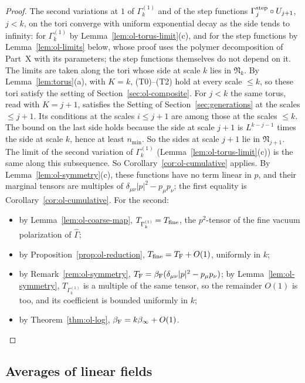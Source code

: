 \begin{proof}
The second variations at $1$ of $\Gamma^{(1)}_k$ and of the step functions $\Gamma^{\rm step}_j\circ U_{j+1}$, $j<k$, on the tori converge with uniform exponential decay as the side tends to infinity: for $\Gamma^{(1)}_k$ by Lemma~\ref{lem:ol-torus-limit}(c), and for the step functions by Lemma~\ref{lem:ol-limits} below, whose proof uses the polymer decomposition of Part~X with its parameters; the step functions themselves do not depend on it. The limits are taken along the tori whose side at scale $k$ lies in $\mathfrak N_k$. By Lemma~\ref{lem:torus}(a), with $K=k$, (T0)--(T2) hold at every scale $\le k$, so these tori satisfy the setting of Section~\ref{sec:ol-composite}. For $j<k$ the same torus, read with $K=j+1$, satisfies the Setting of Section~\ref{sec:generations} at the scales $\le j+1$. Its conditions at the scales $i\le j+1$ are among those at the scales $\le k$. The bound on the last side holds because the side at scale $j+1$ is $L^{k-j-1}$ times the side at scale $k$, hence at least $n_{\min}$. So the sides at scale $j+1$ lie in $\mathfrak N_{j+1}$. The limit of the second variation of $\Gamma^{(1)}_k$ (Lemma~\ref{lem:ol-torus-limit}(c)) is the same along this subsequence. So Corollary~\ref{cor:ol-cumulative} applies. By Lemma~\ref{lem:ol-symmetry}(c), these functions have no term linear in $p$, and their marginal tensors are multiples of $\delta_{\mu\nu}|p|^2-p_\mu p_\nu$; the first equality is Corollary~\ref{cor:ol-cumulative}. For the second:
\begin{itemize}
\item by Lemma~\ref{lem:ol-coarse-map}, $T_{\Gamma^{(1)}_k}=T_{\rm fine}$, the $p^2$-tensor of the fine vacuum polarization of $\widehat\Gamma$;
\item by Proposition~\ref{prop:ol-reduction}, $T_{\rm fine}=T_{\rm F}+O(1)$, uniformly in $k$;
\item by Remark~\ref{rem:ol-symmetry}, $T_{\rm F}=\beta_{\rm F}(\delta_{\mu\nu}|p|^2-p_\mu p_\nu)$; by Lemma~\ref{lem:ol-symmetry}, $T_{\Gamma^{(1)}_k}$ is a multiple of the same tensor, so the remainder $O(1)$ is too, and its coefficient is bounded uniformly in $k$;
\item by Theorem~\ref{thm:ol-log}, $\beta_{\rm F}=k\beta_\infty+O(1)$.
\end{itemize}
\end{proof}

\subsection{Averages of linear fields}\label{subsec:ol-linear}

